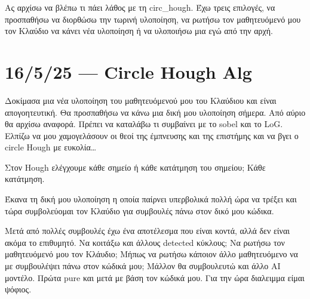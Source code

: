 \documentclass{article}
\begin{document}
Ας αρχίσω να βλέπω 
τι πάει λάθος με τη circ\_hough. Έχω τρεις επιλογές, να προσπαθήσω να διορθώσω
την τωρινή υλοποίηση, να ρωτήσω τον μαθητευόμενό μου τον Κλαύδιο να κάνει
νέα υλοποίηση ή να υλοποιήσω μια εγώ από την αρχή.

\section{16/5/25 --- Circle Hough Alg}
Δοκίμασα μια νέα υλοποίηση του μαθητευόμενού μου του Κλαύδιου και είναι
απογοητευτική. Θα προσπαθήσω να κάνω μια δική μου υλοποίηση σήμερα.
Από αύριο θα αρχίσω αναφορά. Πρέπει να καταλάβω τι συμβαίνει με το sobel
και το LoG. Ελπίζω να μου χαμογελάσουν οι θεοί της έμπνευσης και της επιστήμης
και να βγει ο circle Hough με ευκολία\ldots{} 

Στον Hough ελέγχουμε κάθε σημείο ή κάθε κατάτμηση του σημείου; Κάθε κατάτμηση.

Έκανα τη δική μου υλοποίηση η οποία παίρνει υπερβολικά πολλή ώρα να τρέξει
και τώρα συμβολεύομαι τον Κλαύδιο για συμβουλές πάνω στον δικό μου κώδικα.

Μετά από πολλές συμβουλές έχω ένα αποτέλεσμα που είναι κοντά, αλλά δεν είναι
ακόμα το επιθυμητό. Να κοιτάξω και άλλους detected κύκλους; Να ρωτήσω τον
μαθητευόμενό μου τον Κλάυδιο; Μήπως να ρωτήσω κάποιον άλλο μαθητευόμενο 
να με συμβουλέψει πάνω στον κώδικά μου; Μάλλον θα συμβουλευτώ και άλλο 
AI μοντέλο. Πρώτα pure και μετά με βάση τον κώδικά μου. Για την ώρα διαλειμμα
είμαι ψόφιος.
\end{document}
